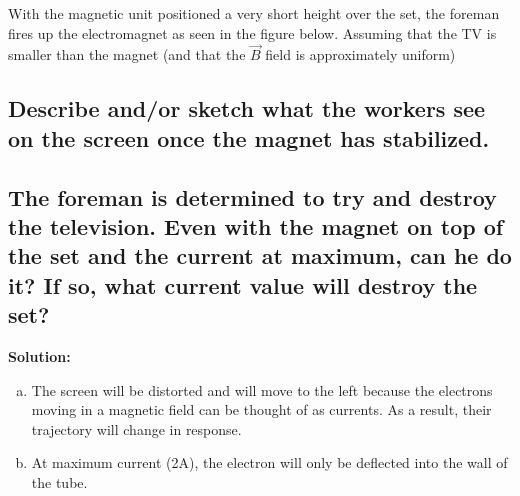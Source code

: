 \documentclass{./cls/hw}
\newcommand{\sol}{\large\textbf{Solution: }\normalsize}
\begin{document}
With the magnetic unit positioned a very short height over the set, the
foreman
fires up the electromagnet as seen in the figure below. Assuming that the TV
is smaller than the magnet (and that the $\vec{B}$ field is approximately
uniform)

\subsection{Describe and/or sketch what the workers see on the screen once the
magnet has stabilized.}
\subsection{The foreman is determined to try and destroy the television. Even
  with the magnet on top of the set and the current at maximum, can he do it?
If so, what current value will destroy the set?}
\sol
  \begin{enumerate}[(a)]
    \item The screen will be distorted and will move to the left because the
      electrons moving in a magnetic field can be thought of as currents. As a
      result, their trajectory will change in response.
    \item At maximum current (2A), the electron will only be deflected into the
      wall of the tube.
\end{enumerate}
\end{document}
